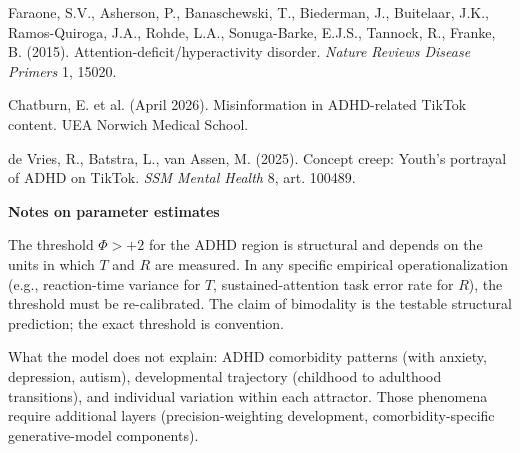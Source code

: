 \documentclass[12pt]{article}
\begin{document}
\medskip
\noindent[3] Faraone, S.V., Asherson, P., Banaschewski, T., Biederman, J., Buitelaar, J.K., Ramos-Quiroga, J.A., Rohde, L.A., Sonuga-Barke, E.J.S., Tannock, R., Franke, B. (2015). Attention-deficit/hyperactivity disorder. \textit{Nature Reviews Disease Primers} 1, 15020.

\medskip
\noindent[4] Chatburn, E. et al. (April 2026). Misinformation in ADHD-related TikTok content. UEA Norwich Medical School.

\medskip
\noindent[5] de Vries, R., Batstra, L., van Assen, M. (2025). Concept creep: Youth's portrayal of ADHD on TikTok. \textit{SSM Mental Health} 8, art. 100489.

\vspace{0.5cm}

\noindent\textbf{Notes on parameter estimates}

\medskip
\noindent The threshold $\Phi > +2$ for the ADHD region is structural and depends on the units in which $T$ and $R$ are measured. In any specific empirical operationalization (e.g., reaction-time variance for $T$, sustained-attention task error rate for $R$), the threshold must be re-calibrated. The claim of bimodality is the testable structural prediction; the exact threshold is convention.

\medskip
\noindent What the model does not explain: ADHD comorbidity patterns (with anxiety, depression, autism), developmental trajectory (childhood to adulthood transitions), and individual variation within each attractor. Those phenomena require additional layers (precision-weighting development, comorbidity-specific generative-model components).
\end{document}

